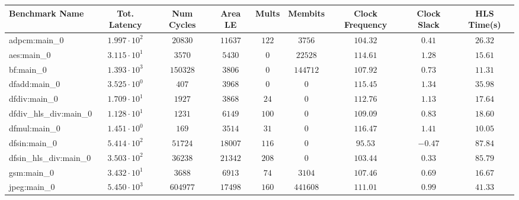 \begin{tabular}{|l|c|c|c|c|c|c|c|c|}
\hline
Benchmark Name          & Tot. Latency           & Num Cycles  & Area LE    & Mults   & Membits    & Clock Frequency & Clock Slack & HLS Time(s) \\
\hline
adpcm:main\_0           & $ 1.997 \cdot 10^{2} $ & $ 20830   $ & $ 11637  $ & $ 122 $ & $ 3756   $ & $ 104.32      $ & $ 0.41    $ & $ 26.32   $ \\
aes:main\_0             & $ 3.115 \cdot 10^{1} $ & $ 3570    $ & $ 5430   $ & $ 0   $ & $ 22528  $ & $ 114.61      $ & $ 1.28    $ & $ 15.61   $ \\
bf:main\_0              & $ 1.393 \cdot 10^{3} $ & $ 150328  $ & $ 3806   $ & $ 0   $ & $ 144712 $ & $ 107.92      $ & $ 0.73    $ & $ 11.31   $ \\
dfadd:main\_0           & $ 3.525 \cdot 10^{0} $ & $ 407     $ & $ 3968   $ & $ 0   $ & $ 0      $ & $ 115.45      $ & $ 1.34    $ & $ 35.98   $ \\
dfdiv:main\_0           & $ 1.709 \cdot 10^{1} $ & $ 1927    $ & $ 3868   $ & $ 24  $ & $ 0      $ & $ 112.76      $ & $ 1.13    $ & $ 17.64   $ \\
dfdiv\_hls\_div:main\_0 & $ 1.128 \cdot 10^{1} $ & $ 1231    $ & $ 6149   $ & $ 100 $ & $ 0      $ & $ 109.09      $ & $ 0.83    $ & $ 18.60   $ \\
dfmul:main\_0           & $ 1.451 \cdot 10^{0} $ & $ 169     $ & $ 3514   $ & $ 31  $ & $ 0      $ & $ 116.47      $ & $ 1.41    $ & $ 10.05   $ \\
dfsin:main\_0           & $ 5.414 \cdot 10^{2} $ & $ 51724   $ & $ 18007  $ & $ 116 $ & $ 0      $ & $ 95.53       $ & $ -0.47   $ & $ 87.84   $ \\
dfsin\_hls\_div:main\_0 & $ 3.503 \cdot 10^{2} $ & $ 36238   $ & $ 21342  $ & $ 208 $ & $ 0      $ & $ 103.44      $ & $ 0.33    $ & $ 85.79   $ \\
gsm:main\_0             & $ 3.432 \cdot 10^{1} $ & $ 3688    $ & $ 6913   $ & $ 74  $ & $ 3104   $ & $ 107.46      $ & $ 0.69    $ & $ 16.67   $ \\
jpeg:main\_0            & $ 5.450 \cdot 10^{3} $ & $ 604977  $ & $ 17498  $ & $ 160 $ & $ 441608 $ & $ 111.01      $ & $ 0.99    $ & $ 41.33   $ \\

\end{tabular}
